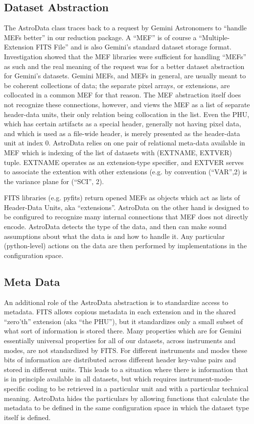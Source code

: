 \documentclass[letterpaper,10pt,english]{sphinxmanual}
\begin{document}
\subsection{Dataset Abstraction}
\label{gen.ADMANUAL_ADConcepts:dataset-abstraction}
The AstroData class traces back to a request by Gemini Astronomers to
``handle MEFs better'' in our reduction package. A ``MEF'' is of course a
``Multiple-Extension FITS File'' and is also Gemini's standard dataset
storage format. Investigation showed that the MEF libraries were
sufficient for handling ``MEFs'' as such and the real meaning of the
request was for a better dataset abstraction for Gemini's datasets.
Gemini MEFs, and MEFs in general, are usually meant to be coherent
collections of data; the separate pixel arrays, or extensions, are
collocated in a common MEF for that reason. The MEF abstraction itself
does not recognize these connections, however, and views the MEF as a
list of separate header-data units, their only relation being
collocation in the list. Even the PHU, which has certain artifacts as
a special header, generally not having pixel data, and which is used
as a file-wide header, is merely presented as the header-data unit at
index 0. AstroData relies on one pair of relational meta-data
available in MEF which is indexing of the list of datasets with
(EXTNAME, EXTVER) tuple. EXTNAME operates as an extension-type
specifier, and EXTVER serves to associate the extention with other
extensions (e.g. by convention (``VAR'',2) is the variance plane for
(``SCI'', 2).

FITS libraries (e.g. pyfits) return opened MEFs as objects which act
as lists of Header-Data Units, aka ``extensions''. AstroData on the
other hand is designed to be configured to recognize many internal
connections that MEF does not directly encode. AstroData detects the
type of the data, and then can make sound assumptions about what the
data is and how to handle it. Any particular (python-level) actions on
the data are then performed by implementations in the configuration
space.


\subsection{Meta Data}
\label{gen.ADMANUAL_ADConcepts:meta-data}
An additional role of the AstroData abstraction is to standardize
access to metadata. FITS allows copious metadata in each extension and
in the shared ``zero'th'' extension (aka ``the PHU''), but it standardizes
only a small subset of what sort of information is stored there. Many
properties which are for Gemini essentially universal properties for
all of our datasets, across instruments and modes, are not
standardized by FITS. For different instruments and modes these bits
of information are distributed across different header key-value pairs
and stored in different units. This leads to a situation where there
is information that is in principle available in all datasets, but
which requires instrument-mode-specific coding to be retrieved in a
particular unit and with a particular technical meaning. AstroData
hides the particulars by allowing functions that calculate the
metadata to be defined in the same configuration space in which the
dataset type itself is defined.
\end{document}
